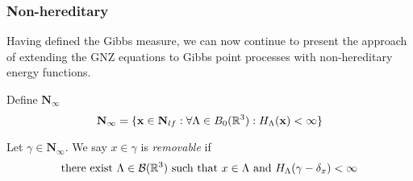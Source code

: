 % 
% 
% 


\subsubsection{Non-hereditary}
Having defined the Gibbs measure, we can now continue to present the approach of \cite{DereudreLavancier2007} extending the GNZ equations to Gibbs point processes with non-hereditary energy functions.

Define $\mathbf N_\infty$
$$\mathbf N_\infty = \{{\mathbf{x}} \in \mathbf N_{lf}: \forall \Lambda \in B_0({\mathbb R^3}): H_\Lambda({\mathbf{x}})< \infty\}$$

\begin{definition}
	Let $\gamma \in \mathbf N_\infty$. We say $x\in\gamma$ is \textit{removable} if 
	$$\text{there exist } \Lambda \in \mathcal B({\mathbb R^3}) \text{ such that } x\in\Lambda \text{ and } H_\Lambda(\gamma - \delta_x)<\infty$$
\end{definition}


